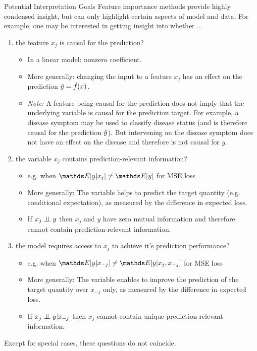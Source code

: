 \begin{vbframe}{Potential Interpretation Goals}
Feature importance methods provide highly condensed insight, but can only highlight certain aspects of model and data. For example, one may be interested in getting insight into whether ...
\lz
\begin{enumerate}
    \item the feature $x_j$ is causal for the prediction?
    \begin{itemize}
      \item In a linear model: nonzero coefficient.
      \item More generally: changing the input to a feature $x_j$ has an effect on the prediction $\hat{y} = \hat{f}(x)$.
      \item \textit{Note:} A feature being causal for the prediction does not imply that the underlying variable is causal for the prediction target. For example, a disease symptom may be used to classify disease status (and is therefore causal for the prediction $\hat{y}$). But intervening on the disease symptom does not have an effect on the disease and therefore is not causal for $y$.
    \end{itemize} \framebreak
    \item the variable $x_j$ contains prediction-relevant information?
    \begin{itemize}
      \item e.g. when $\E[y|x_j] \neq \E[y]$ for MSE loss
      \item More generally: The variable helps to predict the target quantity (e.g. conditional expectation), as measured by the difference in expected loss.
      \item If $x_j \perp \!\!\! \perp y$ then $x_j$ and $y$ have zero mutual information and therefore cannot contain prediction-relevant information.
    \end{itemize}
    \item the model requires access to $x_j$ to achieve it's prediction performance?
    \begin{itemize}
      \item e.g. when $\E[y|x_{-j}] \neq \E[y|x_j, x_{-j}]$ for MSE loss
      \item More generally: The variable enables to improve the prediction of the target quantity over $x_{-j}$ only, as measured by the difference in expected loss.
      \item If $x_j \perp \!\!\! \perp y | x_{-j}$ then $x_j$ cannot contain unique prediction-relevant information.
    \end{itemize}
\end{enumerate}
Except for special cases, these questions do not coincide.
\end{vbframe}

